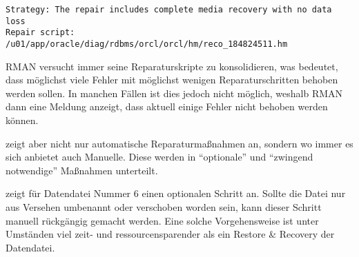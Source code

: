         \begin{lstlisting}[caption={Das Reparaturskript},label=admin1540,language=rman]
Strategy: The repair includes complete media recovery with no data loss
Repair script: /u01/app/oracle/diag/rdbms/orcl/orcl/hm/reco_184824511.hm
        \end{lstlisting}
        \begin{merke}
          RMAN versucht immer seine Reparaturskripte zu konsolidieren, was bedeutet, dass möglichst viele Fehler mit möglichst wenigen Reparaturschritten behoben werden sollen. In manchen Fällen ist dies jedoch nicht möglich, weshalb RMAN dann eine Meldung anzeigt, dass aktuell einige Fehler nicht behoben werden können.
        \end{merke}
         zeigt aber nicht nur automatische Reparaturmaßnahmen an, sondern wo immer es sich anbietet auch Manuelle. Diese werden in \enquote{optionale} und \enquote{zwingend notwendige} Maßnahmen unterteilt.

         zeigt für Datendatei Nummer 6 einen optionalen Schritt an. Sollte die Datei nur aus Versehen umbenannt oder verschoben worden sein, kann dieser Schritt manuell rückgängig gemacht werden. Eine solche Vorgehensweise ist unter Umständen viel zeit- und ressourcensparender als ein Restore \& Recovery der Datendatei.

